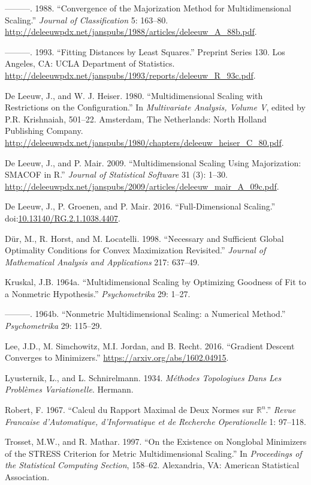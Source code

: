 \documentclass[12pt,]{article}
\begin{document}
\hypertarget{ref-deleeuw_A_88b}{}
---------. 1988. ``Convergence of the Majorization Method for
Multidimensional Scaling.'' \emph{Journal of Classification} 5: 163--80.
\url{http://deleeuwpdx.net/janspubs/1988/articles/deleeuw_A_88b.pdf}.

\hypertarget{ref-deleeuw_R_93c}{}
---------. 1993. ``Fitting Distances by Least Squares.'' Preprint Series
130. Los Angeles, CA: UCLA Department of Statistics.
\url{http://deleeuwpdx.net/janspubs/1993/reports/deleeuw_R_93c.pdf}.

\hypertarget{ref-deleeuw_heiser_C_80}{}
De Leeuw, J., and W. J. Heiser. 1980. ``Multidimensional Scaling with
Restrictions on the Configuration.'' In \emph{Multivariate Analysis,
Volume V}, edited by P.R. Krishnaiah, 501--22. Amsterdam, The
Netherlands: North Holland Publishing Company.
\url{http://deleeuwpdx.net/janspubs/1980/chapters/deleeuw_heiser_C_80.pdf}.

\hypertarget{ref-deleeuw_mair_A_09c}{}
De Leeuw, J., and P. Mair. 2009. ``Multidimensional Scaling Using
Majorization: SMACOF in R.'' \emph{Journal of Statistical Software} 31
(3): 1--30.
\url{http://deleeuwpdx.net/janspubs/2009/articles/deleeuw_mair_A_09c.pdf}.

\hypertarget{ref-deleeuw_groenen_mair_E_16e}{}
De Leeuw, J., P. Groenen, and P. Mair. 2016. ``Full-Dimensional
Scaling.''
doi:\href{https://doi.org/10.13140/RG.2.1.1038.4407}{10.13140/RG.2.1.1038.4407}.

\hypertarget{ref-dur_horst_locatelli_98}{}
Dür, M., R. Horst, and M. Locatelli. 1998. ``Necessary and Sufficient
Global Optimality Conditions for Convex Maximization Revisited.''
\emph{Journal of Mathematical Analysis and Applications} 217: 637--49.

\hypertarget{ref-kruskal_64a}{}
Kruskal, J.B. 1964a. ``Multidimensional Scaling by Optimizing Goodness
of Fit to a Nonmetric Hypothesis.'' \emph{Psychometrika} 29: 1--27.

\hypertarget{ref-kruskal_64b}{}
---------. 1964b. ``Nonmetric Multidimensional Scaling: a Numerical
Method.'' \emph{Psychometrika} 29: 115--29.

\hypertarget{ref-lee_simchowitz_jordan_recht_16}{}
Lee, J.D., M. Simchowitz, M.I. Jordan, and B. Recht. 2016. ``Gradient
Descent Converges to Minimizers.''
\url{https://arxiv.org/abs/1602.04915}.

\hypertarget{ref-lyusternik-schnirelmann_34}{}
Lyusternik, L., and L. Schnirelmann. 1934. \emph{Méthodes Topologiues
Dans Les Problèmes Variationelle}. Hermann.

\hypertarget{ref-robert_67}{}
Robert, F. 1967. ``Calcul du Rapport Maximal de Deux Normes sur
\(\mathbb{R}^n\).'' \emph{Revue Francaise d'Automatique, d'Informatique
et de Recherche Operationelle} 1: 97--118.

\hypertarget{ref-trosset_mathar_97}{}
Trosset, M.W., and R. Mathar. 1997. ``On the Existence on Nonglobal
Minimizers of the STRESS Criterion for Metric Multidimensional
Scaling.'' In \emph{Proceedings of the Statistical Computing Section},
158--62. Alexandria, VA: American Statistical Association.
\end{document}

